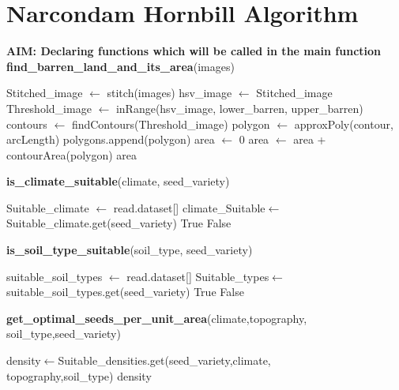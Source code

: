 \documentclass[pmlr,twocolumn,10pt]{jmlr}
\begin{document}
\section{Narcondam Hornbill Algorithm }

\begin{algorithm} [ht]
\begin{scriptsize}
\begin{algorithmic}[1]

\STATE \textbf{AIM: Declaring functions which will be called in the main function}
\medbreak
\STATE \textbf{find\_barren\_land\_and\_its\_area}(images) 
    \begin{ALC@g}
    \STATE  Stitched\_image $\gets$ stitch(images)
    \STATE  hsv\_image $\gets$ Stitched\_image
    \STATE  Threshold\_image $\gets$ inRange(hsv\_image, lower\_barren, upper\_barren)
    \STATE  contours $\gets$ findContours(Threshold\_image)
        \STATE  polygon $\gets$ approxPoly(contour, arcLength)
        \STATE  polygons.append(polygon)
    \ENDFOR
    \STATE  area $\gets$ 0
    \STATE  area $\gets$ area + contourArea(polygon)
    \ENDFOR
    \STATE  \Return area
    \end{ALC@g}
\smallbreak
\STATE \textbf{is\_climate\_suitable}(climate, seed\_variety)
    \begin{ALC@g}
    \STATE Suitable\_climate $\gets$ read.dataset[]
    \STATE climate\_Suitable$\gets$Suitable\_climate.get(seed\_variety)
        \STATE \Return True
    \ELSE
        \STATE \Return False
    \ENDIF
    \end{ALC@g}
\smallbreak
\STATE \textbf{is\_soil\_type\_suitable}(soil\_type, seed\_variety)
    \begin{ALC@g}
    \STATE suitable\_soil\_types $\gets$ read.dataset[]
    \STATE Suitable\_types$\gets$suitable\_soil\_types.get(seed\_variety)
        \STATE \Return True
    \ELSE
        \STATE \Return False
    \ENDIF
    \end{ALC@g}
\smallbreak

\STATE \textbf{get\_optimal\_seeds\_per\_unit\_area}(climate,topography,\\soil\_type,seed\_variety) 
    \begin{ALC@g}
    \STATE  density$\gets$Suitable\_densities.get(seed\_variety,climate,\\topography,soil\_type)
    \STATE\Return density
    \end{ALC@g}
\smallbreak


\end{algorithmic}
\end{scriptsize}
\end{algorithm}
\end{document}
